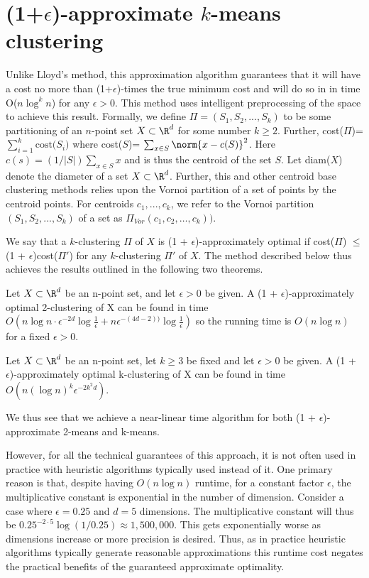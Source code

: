 \section{(1+$\epsilon$)-approximate $k$-means clustering}

Unlike Lloyd's method, this approximation algorithm guarantees that it will have
a cost no more than (1+$\epsilon$)-times the true minimum cost and will do so in
in time O($n \log^k n$) for any $\epsilon>0$. This method uses intelligent
preprocessing of the space to achieve this result. Formally, we define
$\Pi = (S_1, S_2, ..., S_k)$ to be some partitioning of an $n$-point set
$X \subset \R^d$ for some number $k \geq 2$. Further, cost($\Pi$)=$\sum_{i=1}^k \text{cost(}S_i)$ where cost($S$)=
$\sum_{x \in S} \norm{x-c(S)}^2$. Here $c(s)=(1/|S|) \sum_{x \in S} x$ and is
thus the centroid of the set $S$. Let diam($X$) denote the diameter of a set
$X \subset \R^d$. Further, this and other centroid base clustering methods relies upon the Vornoi partition of a set of points by the centroid points.
For centroids $c_1,...,c_k$, we refer to the Vornoi partition $(S_1,S_2,...,S_k)$ of a set
as $\Pi_{Vor}(c_1, c_2, \dots, c_k))$.

We say that a $k$-clustering $\Pi$ of $X$ is (1 + $\epsilon$)-approximately optimal if cost($\Pi$) $\leq$ (1 + $\epsilon$)cost($\Pi'$) for any $k$-clustering $\Pi'$ of $X$. The method described below thus achieves the results outlined in the following two theorems.

\begin{theorem}
Let $X \subset \R^d$ be an n-point set, and let $\epsilon >0$ be given. A (1 + $\epsilon$)-approximately optimal 2-clustering of X can be found in time $O(n \log n \cdot \epsilon^{-2d} \log \frac{1}{\epsilon} + n \epsilon^{-(4d-2))} \log \frac{1}{\epsilon})$ so the running time is $O(n \log n)$ for a fixed $\epsilon>0$.
\end{theorem}

\begin{theorem}
Let $X \subset \R^d$ be an n-point set, let $k \geq 3$ be fixed and let $\epsilon >0$ be given. A (1 + $\epsilon$)-approximately optimal k-clustering of X can be found in time $O(n(\log n)^k \epsilon^{-2k^2d})$.
\end{theorem}

We thus see that we achieve a near-linear time algorithm for both (1 + $\epsilon$)-approximate 2-means and k-means.

However, for all the technical guarantees of this approach, it is not often used in practice
with heuristic algorithms typically used instead of it. One primary reason is that,
despite having $O(n \log n)$ runtime, for a constant factor $\epsilon$, the multiplicative
constant is exponential in the number of dimension. Consider a case where
$\epsilon=0.25$ and $d=5$ dimensions. The multiplicative constant
will thus be $0.25^{-2 \cdot 5} \log (1/0.25) \approx 1,500,000$. This gets
exponentially worse as dimensions increase or more precision is desired. Thus,
as in practice heuristic algorithms typically generate reasonable approximations
this runtime cost negates the practical benefits of the guaranteed approximate
optimality.

